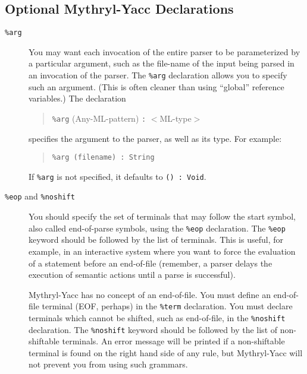 \subsection{Optional Mythryl-Yacc Declarations}
\label{optional-def}
\begin{description}
\item[{\tt \%arg}]
You may want each invocation of the entire parser to be parameterized
by a particular argument, such as the file-name of the input
being parsed in an invocation of the parser.  The {\tt \%arg} declaration
allows you to specify such an argument.
(This is often cleaner than using ``global'' reference variables.)
The declaration
\begin{quote}

        {\tt \%arg} (Any-ML-pattern) {\tt :} $<$ML-type$>$

\end{quote}
specifies the argument to the parser, as well as its type.  For example:
\begin{quote}

        {\tt \%arg (filename) : String}

\end{quote}

If {\tt \%arg} is not specified, it defaults to {\tt () : Void}.
\item[{\tt \%eop} and {\tt \%noshift}]
You should specify the set of
terminals that may follow the start
symbol, also called end-of-parse symbols, using the {\tt \%eop}
declaration.  The {\tt \%eop} keyword should be followed by the list of
terminals.  This is useful, for example, in an interactive system
where you want to force the evaluation of a statement before an
end-of-file (remember, a parser delays the execution of semantic
actions until a parse is successful).

Mythryl-Yacc has no concept of an end-of-file.  You must
define an end-of-file terminal (EOF, perhaps) in the 
{\tt \%term} declaration.
You must declare terminals which cannot be shifted, such as 
end-of-file, in the {\tt \%noshift} declaration.  The
{\tt \%noshift} keyword should be followed by the list of non-shiftable
terminals. An error message will be printed if a non-shiftable terminal
is found on the right hand side of any rule, but Mythryl-Yacc will not prevent
you from using such grammars.


\end{description}
